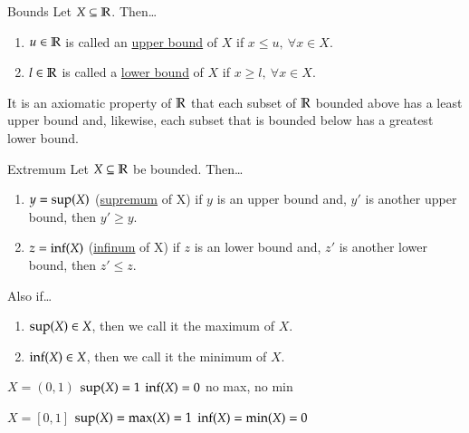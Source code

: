 
\begin{defn}{Bounds}
Let $X\subseteq \mathbb{R}$. Then\dots
\begin{enumerate}
	\item $u\in \mathbb{R}$ is called an \ul{upper bound} of $X$ if $x\leq u,\ \forall x\in X$.
	\item $l\in \mathbb{R}$ is called a \ul{lower bound} of $X$ if $x\geq l,\ \forall x\in X$.
\end{enumerate}
\end{defn}

It is an axiomatic property of $\mathbb{R}$ that each subset of $\mathbb{R}$ bounded above has a least upper bound and, likewise, each subset that is bounded below has a greatest lower bound.

\begin{defn}{Extremum}
	Let $X\subseteq \mathbb{R}$ be bounded. Then\dots
	\begin{enumerate}
	\item $y = \mathrm{sup}(X)$ (\ul{supremum} of X) if $y$ is an upper bound and, $y'$ is another upper bound, then $y' \geq y$.
	\item $z = \mathrm{inf}(X)$ (\ul{infinum} of X) if $z$ is an lower bound and, $z'$ is another lower bound, then $z' \leq z$.
\end{enumerate}
Also if\dots
\begin{enumerate}
\item $\mathrm{sup}(X)\in X$, then we call it the maximum of $X$.
\item $\mathrm{inf}(X)\in X$, then we call it the minimum of $X$.
\end{enumerate}
\end{defn}

\example

$X = (0,1)$ \qquad
$\mathrm{sup}(X) = 1$ \qquad
$\mathrm{inf}(X) = 0$ \qquad
no max, no min

$X = [0,1]$ \qquad
$\mathrm{sup}(X) = \mathrm{max}(X) = 1$ \qquad
$\mathrm{inf}(X) = \mathrm{min}(X) = 0$


